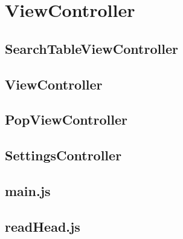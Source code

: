 
\section{ViewController}

\subsection{SearchTableViewController}
\subsection{ViewController}
\subsection{PopViewController}
\subsection{SettingsController}
\subsection{main.js}
\subsection{readHead.js}

